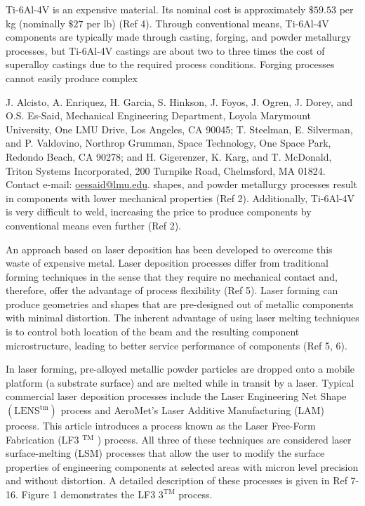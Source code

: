 \documentclass[10pt]{article}
\begin{document}
Ti-6Al-4V is an expensive material. Its nominal cost is approximately $\$ 59.53$ per kg (nominally $\$ 27$ per lb) (Ref 4). Through conventional means, Ti-6Al-4V components are typically made through casting, forging, and powder metallurgy processes, but Ti-6Al-4V castings are about two to three times the cost of superalloy castings due to the required process conditions. Forging processes cannot easily produce complex

J. Alcisto, A. Enriquez, H. Garcia, S. Hinkson, J. Foyos, J. Ogren, J. Dorey, and O.S. Es-Said, Mechanical Engineering Department, Loyola Marymount University, One LMU Drive, Los Angeles, CA 90045; T. Steelman, E. Silverman, and P. Valdovino, Northrop Grumman, Space Technology, One Space Park, Redondo Beach, CA 90278; and H. Gigerenzer, K. Karg, and T. McDonald, Triton Systems Incorporated, 200 Turnpike Road, Chelmsford, MA 01824. Contact e-mail: \href{mailto:oessaid@lmu.edu}{oessaid@lmu.edu}. shapes, and powder metallurgy processes result in components with lower mechanical properties (Ref 2). Additionally, Ti-6Al-4V is very difficult to weld, increasing the price to produce components by conventional means even further (Ref 2).

An approach based on laser deposition has been developed to overcome this waste of expensive metal. Laser deposition processes differ from traditional forming techniques in the sense that they require no mechanical contact and, therefore, offer the advantage of process flexibility (Ref 5). Laser forming can produce geometries and shapes that are pre-designed out of metallic components with minimal distortion. The inherent advantage of using laser melting techniques is to control both location of the beam and the resulting component microstructure, leading to better service performance of components (Ref 5, 6).

In laser forming, pre-alloyed metallic powder particles are dropped onto a mobile platform (a substrate surface) and are melted while in transit by a laser. Typical commercial laser deposition processes include the Laser Engineering Net Shape $\left(\mathrm{LENS}^{\mathrm{tm}}\right)$ process and AeroMet's Laser Additive Manufacturing (LAM) process. This article introduces a process known as the Laser Free-Form Fabrication (LF3 ${ }^{\mathrm{TM}}$ ) process. All three of these techniques are considered laser surface-melting (LSM) processes that allow the user to modify the surface properties of engineering components at selected areas with micron level precision and without distortion. A detailed description of these processes is given in Ref 7-16. Figure 1 demonstrates the LF3 $3^{\mathrm{TM}}$ process.
\end{document}
